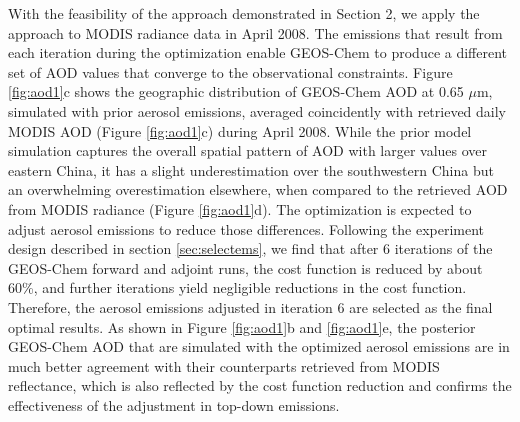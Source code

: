  With the feasibility of the approach demonstrated in Section 2, 
 we apply the approach to MODIS radiance data in April 2008. 
 The emissions that result from each iteration during the optimization 
 enable GEOS-Chem to produce a different set of AOD values 
 that converge to the observational constraints. 
 Figure \ref{fig:aod1}c shows the geographic distribution of GEOS-Chem AOD at 0.65 $\mu$m, 
 simulated with prior aerosol emissions, averaged coincidently with retrieved daily MODIS AOD 
 (Figure \ref{fig:aod1}c) during April 2008. 
 While the prior model simulation captures the overall spatial pattern of AOD 
 with larger values over eastern China, 
 it has a slight underestimation over the southwestern China 
 but an overwhelming overestimation elsewhere, 
 when compared to the retrieved AOD from MODIS radiance (Figure \ref{fig:aod1}d). 
 The optimization is expected to adjust aerosol emissions to reduce those differences. 
 Following the experiment design described in section \ref{sec:selectems}, 
 we find that after 6 iterations of the GEOS-Chem forward and adjoint runs, 
 the cost function is reduced by about 60\%, 
 and further iterations yield negligible reductions in the cost function. 
 Therefore, the aerosol emissions adjusted in iteration 6 are selected as the final optimal results. 
 As shown in Figure \ref{fig:aod1}b and \ref{fig:aod1}e, the posterior GEOS-Chem AOD 
 that are simulated with the optimized aerosol emissions 
 are in much better agreement with their counterparts retrieved from MODIS reflectance, 
 which is also reflected by the cost function reduction and 
 confirms the effectiveness of the adjustment in top-down emissions.

